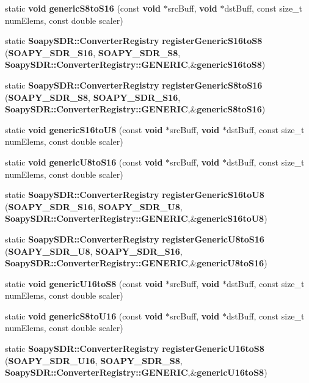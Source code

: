 \begin{DoxyCompactItemize}
\item 
static {\bf void} {\bf generic\+S8to\+S16} (const {\bf void} $\ast$src\+Buff, {\bf void} $\ast$dst\+Buff, const size\+\_\+t num\+Elems, const double scaler)
\item 
static {\bf Soapy\+S\+D\+R\+::\+Converter\+Registry} {\bf register\+Generic\+S16to\+S8} ({\bf S\+O\+A\+P\+Y\+\_\+\+S\+D\+R\+\_\+\+S16}, {\bf S\+O\+A\+P\+Y\+\_\+\+S\+D\+R\+\_\+\+S8}, {\bf Soapy\+S\+D\+R\+::\+Converter\+Registry\+::\+G\+E\+N\+E\+R\+IC},\&{\bf generic\+S16to\+S8})
\item 
static {\bf Soapy\+S\+D\+R\+::\+Converter\+Registry} {\bf register\+Generic\+S8to\+S16} ({\bf S\+O\+A\+P\+Y\+\_\+\+S\+D\+R\+\_\+\+S8}, {\bf S\+O\+A\+P\+Y\+\_\+\+S\+D\+R\+\_\+\+S16}, {\bf Soapy\+S\+D\+R\+::\+Converter\+Registry\+::\+G\+E\+N\+E\+R\+IC},\&{\bf generic\+S8to\+S16})
\item 
static {\bf void} {\bf generic\+S16to\+U8} (const {\bf void} $\ast$src\+Buff, {\bf void} $\ast$dst\+Buff, const size\+\_\+t num\+Elems, const double scaler)
\item 
static {\bf void} {\bf generic\+U8to\+S16} (const {\bf void} $\ast$src\+Buff, {\bf void} $\ast$dst\+Buff, const size\+\_\+t num\+Elems, const double scaler)
\item 
static {\bf Soapy\+S\+D\+R\+::\+Converter\+Registry} {\bf register\+Generic\+S16to\+U8} ({\bf S\+O\+A\+P\+Y\+\_\+\+S\+D\+R\+\_\+\+S16}, {\bf S\+O\+A\+P\+Y\+\_\+\+S\+D\+R\+\_\+\+U8}, {\bf Soapy\+S\+D\+R\+::\+Converter\+Registry\+::\+G\+E\+N\+E\+R\+IC},\&{\bf generic\+S16to\+U8})
\item 
static {\bf Soapy\+S\+D\+R\+::\+Converter\+Registry} {\bf register\+Generic\+U8to\+S16} ({\bf S\+O\+A\+P\+Y\+\_\+\+S\+D\+R\+\_\+\+U8}, {\bf S\+O\+A\+P\+Y\+\_\+\+S\+D\+R\+\_\+\+S16}, {\bf Soapy\+S\+D\+R\+::\+Converter\+Registry\+::\+G\+E\+N\+E\+R\+IC},\&{\bf generic\+U8to\+S16})
\item 
static {\bf void} {\bf generic\+U16to\+S8} (const {\bf void} $\ast$src\+Buff, {\bf void} $\ast$dst\+Buff, const size\+\_\+t num\+Elems, const double scaler)
\item 
static {\bf void} {\bf generic\+S8to\+U16} (const {\bf void} $\ast$src\+Buff, {\bf void} $\ast$dst\+Buff, const size\+\_\+t num\+Elems, const double scaler)
\item 
static {\bf Soapy\+S\+D\+R\+::\+Converter\+Registry} {\bf register\+Generic\+U16to\+S8} ({\bf S\+O\+A\+P\+Y\+\_\+\+S\+D\+R\+\_\+\+U16}, {\bf S\+O\+A\+P\+Y\+\_\+\+S\+D\+R\+\_\+\+S8}, {\bf Soapy\+S\+D\+R\+::\+Converter\+Registry\+::\+G\+E\+N\+E\+R\+IC},\&{\bf generic\+U16to\+S8})

\end{DoxyCompactItemize}
